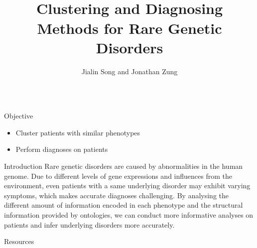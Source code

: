 \documentclass[final]{beamer} %
\title[]{{\fontsize{220}{240}\selectfont \vspace{5cm} \\
Clustering and Diagnosing Methods for Rare Genetic Disorders 
\vspace{5cm}
}}
\author[]{\huge Jialin Song and Jonathan Zung}
\institute[University of Toronto]{\huge Computational Biology Lab, University of Toronto}
\date{}
\begin{document}
  \begin{frame}{}
  \maketitle
  \vspace{-3cm}
    \begin{columns}[T]
      \begin{column}{0.3\linewidth}

     \begin{block}{\Huge Objective}
     \begin{itemize}
    \Large
     \item
     Cluster patients with similar phenotypes
    \item
    Perform diagnoses on patients
     \end{itemize}
      \end{block}

    \begin{block}{\Huge Introduction}
    \Large
    Rare genetic disorders are caused by abnormalities in the human genome. Due to different levels of gene expressions and influences from the environment, even patients with a same underlying disorder may exhibit varying symptoms, which makes accurate diagnoses challenging. By analysing the different amount of information encoded in each phenotype and the structural information provided by ontologies, we can conduct more informative analyses on patients and infer underlying disorders more accurately. 
   \vspace{1cm} 

    \end{block}
    
    \begin{block}{\Huge Resources}
 

\end{block}
\end{column}
\end{columns}
\end{frame}
\end{document}
